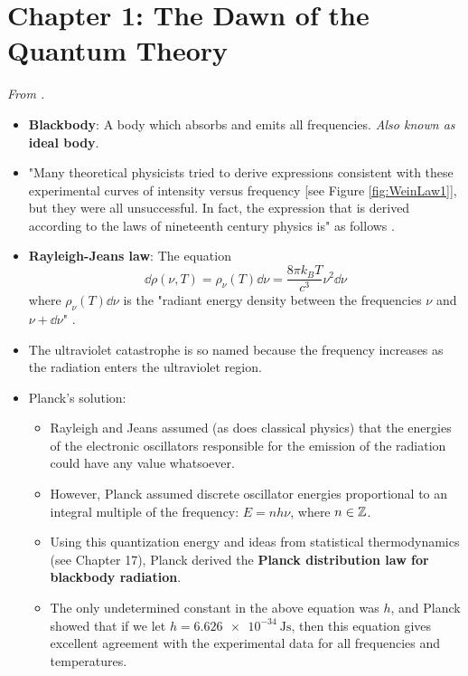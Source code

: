 \documentclass[../notes.tex]{subfiles}
\begin{document}
\section{Chapter 1: The Dawn of the Quantum Theory}
\emph{From \textcite{bib:McQuarrieSimon}.}
\begin{itemize}
    \item {}\textbf{Blackbody}: A body which absorbs and emits all frequencies. \emph{Also known as} \textbf{ideal body}.
    \item "Many theoretical physicists tried to derive expressions consistent with these experimental curves of intensity versus frequency [see Figure \ref{fig:WeinLaw1}], but they were all unsuccessful. In fact, the expression that is derived according to the laws of nineteenth century physics is" as follows \parencite[3]{bib:McQuarrieSimon}.
    \item \textbf{Rayleigh-Jeans law}: The equation
    \begin{equation*}
        \dd{\rho(\nu,T)} = \rho_\nu(T)\dd{\nu} = \frac{8\pi k_BT}{c^3}\nu^2\dd{\nu}
    \end{equation*}
    where $\rho_\nu(T)\dd{\nu}$ is the "radiant energy density between the frequencies $\nu$ and $\nu+\dd{\nu}$" \parencite[3]{bib:McQuarrieSimon}.
    \item The ultraviolet catastrophe is so named because the frequency increases as the radiation enters the ultraviolet region.
    \item Planck's solution:
    \begin{itemize}
        \item Rayleigh and Jeans assumed (as does classical physics) that the energies of the electronic oscillators responsible for the emission of the radiation could have any value whatsoever.
        \item However, Planck assumed discrete oscillator energies proportional to an integral multiple of the frequency: $E=nh\nu$, where $n\in\mathbb{Z}$.
        \item Using this quantization energy and ideas from statistical thermodynamics (see Chapter 17), Planck derived the \textbf{Planck distribution law for blackbody radiation}.
        \item The only undetermined constant in the above equation was $h$, and Planck showed that if we let $h=\SI{6.626e-34}{\joule\second}$, then this equation gives excellent agreement with the experimental data for all frequencies and temperatures.
    \end{itemize}

\end{itemize}
\end{document}
